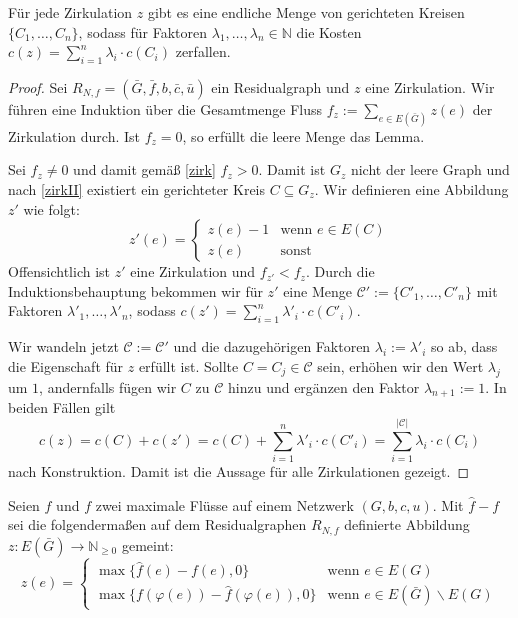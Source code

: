 \begin{lem}\label{zerl}Für jede Zirkulation $z$ gibt es eine endliche Menge von gerichteten Kreisen $\{C_1,\ldots,C_n\}$, sodass für Faktoren $\lambda_1,\ldots,\lambda_n\in\mathbb{N}$ die Kosten $c(z) = \sum_{i=1}^{n} \lambda_i\cdot c(C_i)$ zerfallen.\end{lem}
\begin{proof}Sei $R_{N,f}= (\bar{G},\bar{f},b,\bar{c},\bar{u})$ ein Residualgraph und $z$ eine Zirkulation. Wir führen eine Induktion über die Gesamtmenge Fluss $f_z:=\sum_{e\in E(\bar{G})}z(e)$ der Zirkulation durch. Ist $f_z=0$, so erfüllt die leere Menge das Lemma.
    
Sei $f_z\neq0$ und damit gemäß \cref{zirk} $f_z>0$. Damit ist $G_z$ nicht der leere Graph und nach \cref{zirkII} existiert ein gerichteter Kreis $C\subseteq G_z$. Wir definieren eine Abbildung $z'$ wie folgt:
\begin{equation*}z'(e)=\begin{cases}
z(e)-1&\text{wenn }e\in E(C)\\
z(e)&\text{sonst}\end{cases}
\end{equation*}
Offensichtlich ist $z'$ eine Zirkulation und $f_{z'}<f_z$. Durch die Induktionsbehauptung bekommen wir für $z'$ eine Menge $\mathscr{C'}:=\{C'_1,\ldots,C'_n\}$ mit Faktoren $\lambda'_1,\ldots,\lambda'_n$, sodass $c(z') = \sum_{i=1}^{n} \lambda'_i\cdot c(C'_i)$.

Wir wandeln jetzt $\mathscr{C}:=\mathscr{C'}$ und die dazugehörigen Faktoren $\lambda_i:=\lambda'_i$ so ab, dass die Eigenschaft für $z$ erfüllt ist. Sollte $C=C_j\in\mathscr{C}$ sein, erhöhen wir den Wert $\lambda_j$ um $1$, andernfalls fügen wir $C$ zu $\mathscr{C}$ hinzu und ergänzen den Faktor $\lambda_{n+1}:=1$. In beiden Fällen gilt
\begin{equation*}c(z)=c(C)+c(z')=c(C)+\sum_{i=1}^{n} \lambda'_i\cdot c(C'_i)=\sum_{i=1}^{|\mathscr{C}|} \lambda_i\cdot c(C_i)\end{equation*}
nach Konstruktion. Damit ist die Aussage für alle Zirkulationen gezeigt.\end{proof}

\begin{nota}Seien $\hat{f}$ und $f$ zwei maximale Flüsse auf einem Netzwerk $(G,b,c,u)$. Mit $\hat{f}-f$ sei die folgendermaßen auf dem Residualgraphen $R_{N,f}$ definierte Abbildung $z:E(\bar{G})\rightarrow\mathbb{N}_{\geq0}$ gemeint:
\begin{equation*}z(e)=\begin{cases}
\max\{\hat{f}(e)-f(e),0\}&\text{wenn } e\in E(G)\\
\max\{f(\varphi(e))-\hat{f}(\varphi(e)),0\}&\text{wenn } e\in E(\bar{G})\backslash E(G)\end{cases}
\end{equation*}\end{nota}

